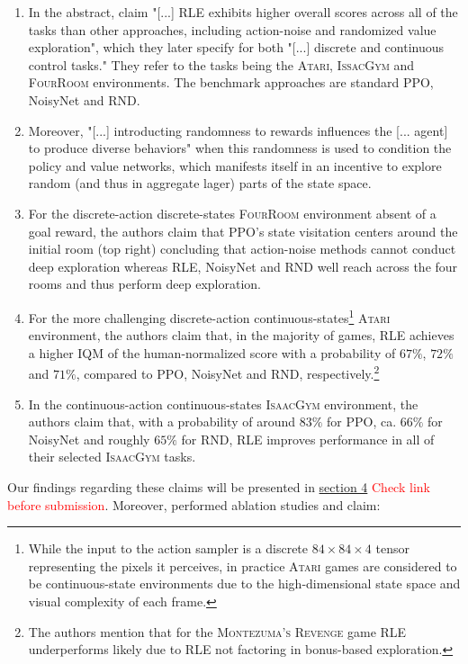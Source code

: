 \documentclass[10pt]{article} %
\begin{document}
\begin{enumerate}
    \item In the abstract, \cite{rle-paper} claim "[...] RLE exhibits higher overall scores across all of the tasks than other approaches, including action-noise and randomized value exploration", which they later specify for both "[...] discrete and continuous control tasks." They refer to the tasks being the \textsc{Atari}, \textsc{IssacGym} and \textsc{FourRoom} environments. The benchmark approaches are standard PPO, NoisyNet and RND.
    \item Moreover, "[...] introducting randomness to rewards influences the [... agent] to produce diverse behaviors" \citep{rle-paper} when this randomness is used to condition the policy and value networks, which manifests itself in an incentive to explore random (and thus in aggregate lager) parts of the state space.
    \item For the discrete-action discrete-states \textsc{FourRoom} environment absent of a goal reward, the authors claim that PPO's state visitation centers around the initial room (top right) concluding that action-noise methods cannot conduct deep exploration whereas RLE, NoisyNet and RND well reach across the four rooms and thus perform deep exploration.
    \item For the more challenging discrete-action continuous-states\footnote{While the input to the action sampler is a discrete $84\times84\times4$ tensor representing the pixels it perceives, in practice \textsc{Atari} games are considered to be continuous-state environments due to the high-dimensional state space and visual complexity of each frame.} \textsc{Atari} environment, the authors claim that, in the majority of games, RLE achieves a higher IQM of the human-normalized score with a probability of $67\%$, $72\%$ and $71\%$, compared to PPO, NoisyNet and RND, respectively.\footnote{The authors mention that for the \textsc{Montezuma's Revenge} game RLE underperforms likely due to RLE not factoring in bonus-based exploration.}
    \item In the continuous-action continuous-states \textsc{IsaacGym} environment, the authors claim that, with a probability of around $83\%$ for PPO, ca. $66\%$ for NoisyNet and roughly $65\%$ for RND, RLE improves performance in all of their selected \textsc{IsaacGym} tasks.
\end{enumerate}

\noindent Our findings regarding these claims will be presented in \hyperlink{sec4}{section 4} \textcolor{red}{Check link before submission}. Moreover, \cite{rle-paper} performed ablation studies and claim:
\end{document}
